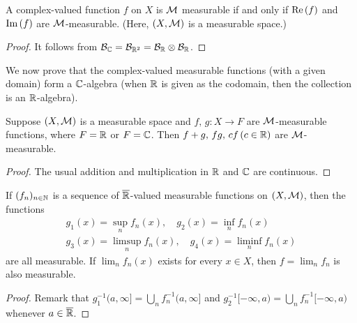 \begin{cor}
    A complex-valued function $f$ on $X$ is ${\mathcal{M}}$ measurable if and only if $\textrm{Re}\left({f}\right)$ and $\textrm{Im}\left({f}\right)$ are ${\mathcal{M}}$-measurable.
    (Here, $(X, {\mathcal{M}})$ is a measurable space.)
\end{cor}
\begin{proof}
    It follows from ${\mathcal{B}}_{{\mathbb{C}}}={\mathcal{B}}_{{\mathbb{R}}^2}={\mathcal{B}}_{{\mathbb{R}}}\otimes{\mathcal{B}}_{{\mathbb{R}}}$.
\end{proof}

We now prove that the complex-valued measurable functions (with a given domain) form a ${\mathbb{C}}$-algebra (when ${\mathbb{R}}$ is given as the codomain, then the collection is an ${\mathbb{R}}$-algebra).
\begin{lem}
    Suppose $(X, {\mathcal{M}})$ is a measurable space and $f,\,g: X\rightarrow F$ are ${\mathcal{M}}$-measurable functions, where $F={\mathbb{R}}$ or $F={\mathbb{C}}$.
    Then $f+g,\, fg,\, cf\, (c\in{\mathbb{R}})$ are ${\mathcal{M}}$-measurable.
\end{lem}
\begin{proof}
    The usual addition and multiplication in ${\mathbb{R}}$ and ${\mathbb{C}}$ are continuous.
\end{proof}

\begin{prop}
    If $(f_n)_{n\in{\mathbb{N}}}$ is a sequence of $\overline{{\mathbb{R}}}$-valued measurable functions on $(X, {\mathcal{M}})$, then the functions
    \begin{eqnarray*}
        &g_1(x)=\sup_n f_n(x),\quad g_2(x)=\inf_n f_n(x)&\\
        &g_3(x)=\limsup_n f_n(x),\quad g_4(x)=\liminf_n f_n(x)&
    \end{eqnarray*}
    are all measurable.
    If $\lim_n f_n(x)$ exists for every $x\in X$, then $f=\lim_n f_n$ is also measurable.
\end{prop}
\begin{proof}
    Remark that $g_1^{-1}(a, \infty]=\bigcup_n f_n^{-1}(a, \infty]$ and $g_2^{-1}[-\infty, a)=\bigcup_n f_n^{-1}[-\infty, a)$ whenever $a\in\overline{{\mathbb{R}}}$.
\end{proof}


